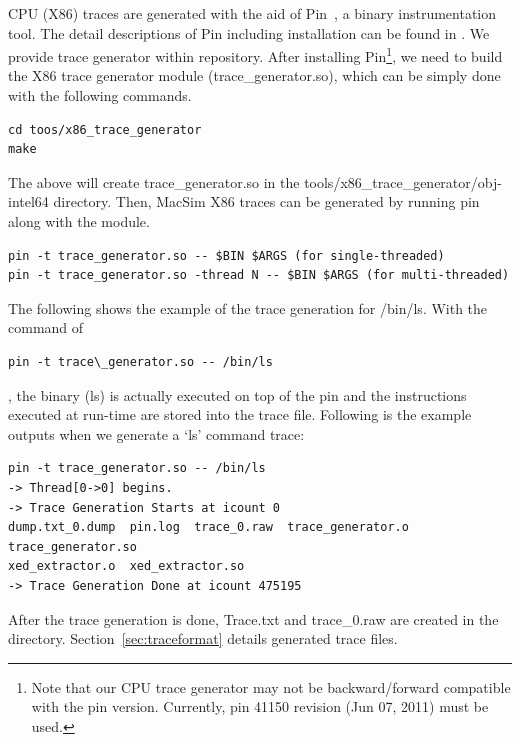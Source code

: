 CPU (X86) traces are generated with the aid of Pin~\cite{pin}, a
binary instrumentation tool.  The detail descriptions of Pin including
installation can be found in .  We provide
\cpu trace generator within \SIM repository. After installing
Pin\footnote{Note that our CPU trace generator may not be
  backward/forward compatible with the pin version. Currently, pin
  41150 revision (Jun 07, 2011) must be used.}, we need to build the
X86 trace generator module (trace\_generator.so), which can be simply
done with the following commands.



\begin{Verbatim}
cd toos/x86_trace_generator
make
\end{Verbatim}

\noindent
The above will create trace\_generator.so in the
tools/x86\_trace\_generator/obj-intel64 directory.  Then, MacSim X86
traces can be generated by running pin along with the module.


\begin{Verbatim}
pin -t trace_generator.so -- $BIN $ARGS (for single-threaded)
pin -t trace_generator.so -thread N -- $BIN $ARGS (for multi-threaded)
\end{Verbatim}


The following shows the example of the trace generation for /bin/ls. 
With the command of 

\begin{Verbatim}
pin -t trace\_generator.so -- /bin/ls
\end{Verbatim}

\noindent
, the binary (ls) is actually executed on top of the pin and the
instructions executed at run-time are stored into the trace
file. Following is the example outputs when we generate a `ls' command
trace:


\begin{Verbatim}
pin -t trace_generator.so -- /bin/ls
-> Thread[0->0] begins.
-> Trace Generation Starts at icount 0
dump.txt_0.dump  pin.log  trace_0.raw  trace_generator.o  trace_generator.so  
xed_extractor.o  xed_extractor.so
-> Trace Generation Done at icount 475195
\end{Verbatim}


After the trace generation is done, Trace.txt and trace\_0.raw are
created in the directory. Section~\ref{sec:traceformat} details
generated trace files.



